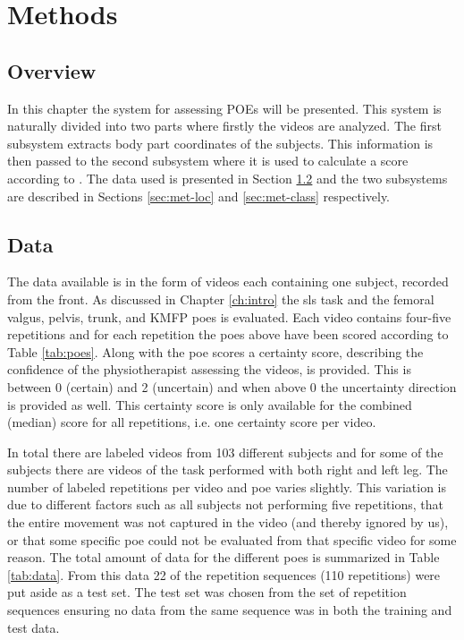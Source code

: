 \chapter{Methods} \label{ch:method}
\section{Overview}
In this chapter the system for assessing POEs will be presented. This system is naturally divided into two parts where firstly the videos are analyzed. The first subsystem extracts body part coordinates of the subjects. This information is then passed to the second subsystem where it is used to calculate a score according to \cite{Nae2017}. The data used is presented in Section \ref{sec:met-data} and the two subsystems are described in Sections \ref{sec:met-loc} and \ref{sec:met-class} respectively.

\section{Data}\label{sec:met-data}
The data available is in the form of videos each containing one subject, recorded from the front. As discussed in Chapter \ref{ch:intro} the \gls{sls} task and the femoral valgus, pelvis, trunk, and KMFP \glspl{poe} is evaluated. Each video contains four-five repetitions and for each repetition the \glspl{poe} above have been scored according to Table \ref{tab:poes}. Along with the \gls{poe} scores a certainty score, describing the confidence of the physiotherapist assessing the videos, is provided. This is between 0 (certain) and 2 (uncertain) and when above 0 the uncertainty direction is provided as well. This certainty score is only available for the combined (median) score for all repetitions, i.e. one certainty score per video.

In total there are labeled videos from 103 different subjects and for some of the subjects there are videos of the task performed with both right and left leg. The number of labeled repetitions per video and \gls{poe} varies slightly. This variation is due to different factors such as all subjects not performing five repetitions, that the entire movement was not captured in the video (and thereby ignored by us), or that some specific \gls{poe} could not be evaluated from that specific video for some reason. The total amount of data for the different \glspl{poe} is summarized in Table \ref{tab:data}. From this data 22 of the repetition sequences (110 repetitions)  were put aside as a test set. The test set was chosen from the set of repetition sequences ensuring no data from the same sequence was in both the training and test data.

